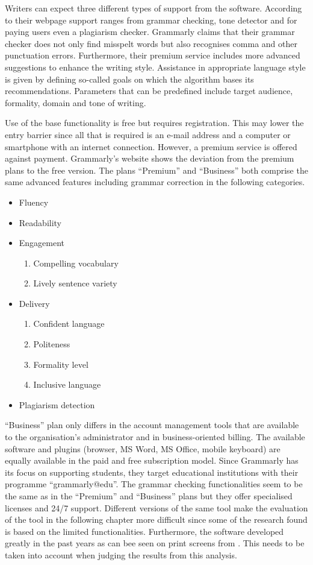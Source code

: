 \documentclass[runningheads]{llncs}
\let\OldTextregistered\textregistered
\renewcommand{\textregistered}{\OldTextregistered\xspace}
\begin{document}
Writers can expect three different types of support from the software. According to their webpage \parencite{noauthor_grammarly_nodate} support ranges from grammar checking, tone detector and for paying users even a plagiarism checker. Grammarly\textregistered claims that their grammar checker does not only find misspelt words but also recognises comma and other punctuation errors. Furthermore, their premium service includes more advanced suggestions to enhance the writing style. Assistance in appropriate language style is given by defining so-called goals on which the algorithm bases its recommendations. Parameters that can be predefined include target audience, formality, domain and tone of writing.   

Use of the base functionality is free but requires registration. This may lower the entry barrier since all that is required is an e-mail address and a computer or smartphone with an internet connection. However, a premium service is offered against payment. Grammarly\textregistered's website \citep{noauthor_grammarly_nodate} shows the deviation from the premium plans to the free version. The plans ``Premium'' and ``Business'' both comprise the same advanced features including grammar correction in the following categories.
\begin{itemize}
 \item Fluency
 \item Readability
 \item Engagement
 \begin{enumerate}
  \item Compelling vocabulary
  \item Lively sentence variety
 \end{enumerate}
 \item Delivery
 \begin{enumerate}
  \item Confident language
  \item Politeness
  \item Formality level
  \item Inclusive language
 \end{enumerate}
 \item Plagiarism detection
\end{itemize}
``Business'' plan only differs in the account management tools that are available to the organisation's administrator and in business-oriented billing. The available software and plugins (browser, MS Word, MS Office, mobile keyboard) are equally available in the paid and free subscription model. Since Grammarly\textregistered has its focus on supporting students, they target educational institutions with their programme ``grammarly@edu''. The grammar checking functionalities seem to be the same as in the ``Premium'' and ``Business'' plans but they offer specialised licenses and 24/7 support. Different versions of the same tool make the evaluation of the tool in the following chapter more difficult since some of the research found is based on the limited functionalities. Furthermore, the software developed greatly in the past years as can bee seen on print screens from \textcite{dembsey_closing_2017}. This needs to be taken into account when judging the results from this analysis.
\end{document}
